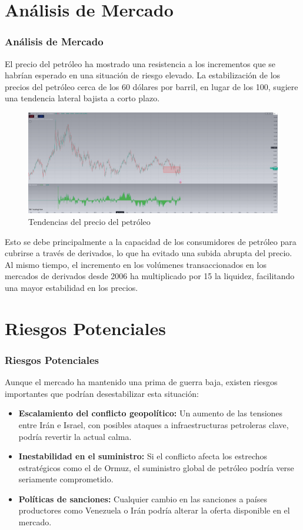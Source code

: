 \documentclass{beamer}
\begin{document}
\section{Análisis de Mercado}
\begin{frame}[allowframebreaks] 
\frametitle{Análisis de Mercado}

El precio del petróleo ha mostrado una resistencia a los incrementos que se habrían esperado en una situación de riesgo elevado. La estabilización de los precios del petróleo cerca de los 60 dólares por barril, en lugar de los 100, sugiere una tendencia lateral bajista a corto plazo.

\begin{figure}[h]
    \centering
    \includegraphics[width=0.8\linewidth]{images/Captura de pantalla 2024-10-10 133834.png} %
    \caption{Tendencias del precio del petróleo}
\end{figure}

Esto se debe principalmente a la capacidad de los consumidores de petróleo para cubrirse a través de derivados, lo que ha evitado una subida abrupta del precio. Al mismo tiempo, el incremento en los volúmenes transaccionados en los mercados de derivados desde 2006 ha multiplicado por 15 la liquidez, facilitando una mayor estabilidad en los precios.
\end{frame}

\section{Riesgos Potenciales}
\begin{frame}
\frametitle{Riesgos Potenciales}

Aunque el mercado ha mantenido una prima de guerra baja, existen riesgos importantes que podrían desestabilizar esta situación:

\begin{itemize}
    \item \textbf{Escalamiento del conflicto geopolítico:} Un aumento de las tensiones entre Irán e Israel, con posibles ataques a infraestructuras petroleras clave, podría revertir la actual calma.
    \item \textbf{Inestabilidad en el suministro:} Si el conflicto afecta los estrechos estratégicos como el de Ormuz, el suministro global de petróleo podría verse seriamente comprometido.
    \item \textbf{Políticas de sanciones:} Cualquier cambio en las sanciones a países productores como Venezuela o Irán podría alterar la oferta disponible en el mercado.
\end{itemize}

\end{frame}
\end{document}
